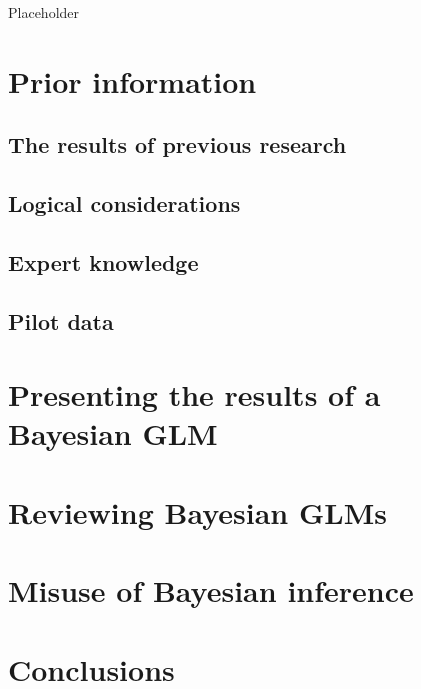 \documentclass[
]{book}
\begin{document}
Placeholder

\hypertarget{prior-information}{%
\section{Prior information}\label{prior-information}}

\hypertarget{the-results-of-previous-research}{%
\subsection{The results of previous
research}\label{the-results-of-previous-research}}

\hypertarget{logical-considerations}{%
\subsection{Logical considerations}\label{logical-considerations}}

\hypertarget{expert-knowledge}{%
\subsection{Expert knowledge}\label{expert-knowledge}}

\hypertarget{pilot-data}{%
\subsection{Pilot data}\label{pilot-data}}

\hypertarget{presenting-the-results-of-a-bayesian-glm}{%
\section{Presenting the results of a Bayesian
GLM}\label{presenting-the-results-of-a-bayesian-glm}}

\hypertarget{reviewing-bayesian-glms}{%
\section{Reviewing Bayesian GLMs}\label{reviewing-bayesian-glms}}

\hypertarget{misuse}{%
\section{Misuse of Bayesian inference}\label{misuse}}

\hypertarget{conclusions-6}{%
\section{Conclusions}\label{conclusions-6}}
\end{document}
